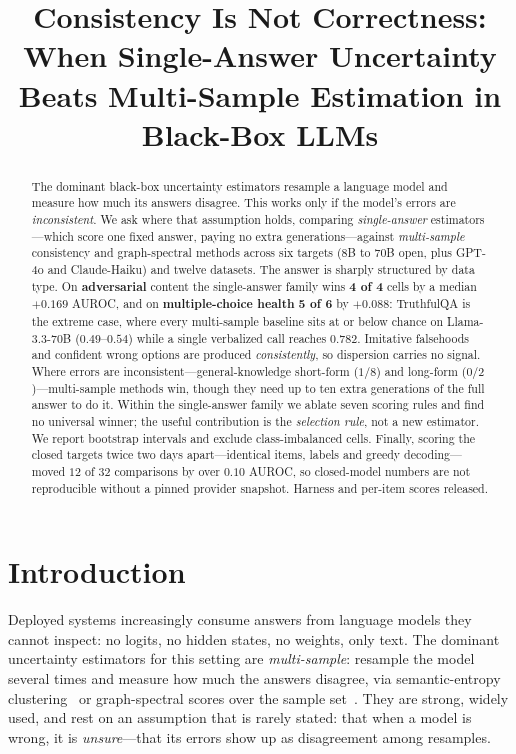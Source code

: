 \documentclass[11pt]{article}
\title{Consistency Is Not Correctness: When Single-Answer Uncertainty \\
Beats Multi-Sample Estimation in Black-Box LLMs}
\begin{document}
\maketitle

\begin{abstract}
The dominant black-box uncertainty estimators resample a language model and measure how much
its answers disagree. This works only if the model's errors are \emph{inconsistent}. We ask where
that assumption holds, comparing \emph{single-answer} estimators---which score one fixed answer,
paying no extra generations---against \emph{multi-sample} consistency and graph-spectral methods
across six targets (8B to 70B open, plus GPT-4o and Claude-Haiku) and twelve datasets. The answer
is sharply structured by data type. On \textbf{adversarial} content the single-answer family wins
\textbf{4 of 4} cells by a median $+0.169$ AUROC, and on \textbf{multiple-choice health} \textbf{5
of 6} by $+0.088$: TruthfulQA is the extreme case, where every multi-sample baseline sits at or
below chance on Llama-3.3-70B ($0.49$--$0.54$) while a single verbalized call reaches $0.782$.
Imitative falsehoods and confident wrong options are produced \emph{consistently}, so dispersion
carries no signal. Where errors are inconsistent---general-knowledge
short-form ($1/8$) and long-form ($0/2$)---multi-sample methods win, though they need up to ten
extra generations of the full answer to do it. Within the single-answer family we ablate seven
scoring rules and find no universal winner; the useful contribution is the \emph{selection rule},
not a new estimator. We report bootstrap intervals and exclude class-imbalanced cells. Finally, scoring the closed
targets twice two days apart---identical items, labels and greedy decoding---moved $12$ of $32$
comparisons by over $0.10$ AUROC, so closed-model numbers are not reproducible without a pinned
provider snapshot. Harness and per-item scores released.
\end{abstract}

\section{Introduction}
Deployed systems increasingly consume answers from language models they cannot inspect: no
logits, no hidden states, no weights, only text. The dominant uncertainty estimators for this
setting are \emph{multi-sample}: resample the model several times and measure how much the
answers disagree, via semantic-entropy clustering~\citep{kuhn2023semantic,farquhar2024detecting}
or graph-spectral scores over the sample set~\citep{lin2024generating}. They are strong, widely
used, and rest on an assumption that is rarely stated: that when a model is wrong, it is
\emph{unsure}---that its errors show up as disagreement among resamples.
\end{document}
